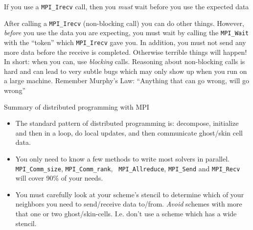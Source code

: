 \documentclass[aspectratio=169]{beamer}
\begin{document}
\begin{frame}{If you use a {\tt MPI\_Irecv} call, then you \emph{must}
    wait before you use the expected data}
  
  After calling a {\tt MPI\_Irecv} (non-blocking call) you can do
  other things. However, \emph{before} you use the data you are
  expecting, you must wait by calling the {\tt MPI\_Wait} with the
  ``token'' which {\tt MPI\_Irecv} gave you.%
  \vskip0.1in%
  In addition, you must not send any more data before the receive is
  completed. Otherwise terrible things will happen!%
  \vskip0.1in%
  {\color{blue} In short: when you can, use \emph{blocking}
    calls. Reasoning about non-blocking calls is hard and can lead to
    very subtle bugs which may only show up when you run on a large
    machine. Remember Murphy's Law: ``Anything that can go wrong, will
    go wrong''}

\end{frame}

\begin{frame}{Summary of distributed programming with MPI}

  \begin{itemize}
  \item The standard pattern of distributed programming is: decompose,
    initialize and then in a loop, do local updates, and then
    communicate ghost/skin cell data.
  \item You only need to know a few methods to write most solvers in
    parallel. {\tt MPI\_Comm\_size}, {\tt MPI\_Comm\_rank}, {\tt
      MPI\_Allreduce}, {\tt MPI\_Send} and {\tt MPI\_Recv} will cover
    90\% of your needs.
  \item You must carefully look at your scheme's stencil to determine
    which of your neighbors you need to send/receive data
    to/from. \emph{Avoid} schemes with more that one or two
    ghost/skin-cells. I.e. don't use a scheme which has a wide
    stencil.
  \end{itemize}

\end{frame}
\end{document}
